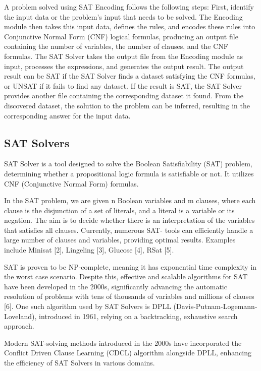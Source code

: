 A problem solved using SAT Encoding follows the following steps: First, identify the
input data or the problem's input that needs to be solved. The Encoding module then
takes this input data, defines the rules, and encodes these rules into Conjunctive Normal
Form (CNF) logical formulas, producing an output file containing the number of
variables, the number of clauses, and the CNF formulas. The SAT Solver takes the
output file from the Encoding module as input, processes the expressions, and generates
the output result. The output result can be SAT if the SAT Solver finds a dataset
satisfying the CNF formulas, or UNSAT if it fails to find any dataset. If the result is
SAT, the SAT Solver provides another file containing the corresponding dataset it
found. From the discovered dataset, the solution to the problem can be inferred, resulting
in the corresponding answer for the input data.

\subsection{SAT Solvers}
SAT Solver is a tool designed to solve the Boolean Satisfiability (SAT) problem,
determining whether a propositional logic formula is satisfiable or not. It utilizes CNF
(Conjunctive Normal Form) formulas.

In the SAT problem, we are given n Boolean variables and m clauses, where each clause
is the disjunction of a set of literals, and a literal is a variable or its negation. The aim is
to decide whether there is an interpretation of the variables that satisfies all clauses.
Currently, numerous SAT- tools can efficiently handle a large number of clauses and
variables, providing optimal results. Examples include Minisat [2], Lingeling [3],
Glucose [4], RSat [5].

SAT is proven to be NP-complete, meaning it has exponential time complexity in the
worst case scenario. Despite this, effective and scalable algorithms for SAT have been
developed in the 2000s, significantly advancing the automatic resolution of problems
with tens of thousands of variables and millions of clauses [6]. One such algorithm used
by SAT Solvers is DPLL (Davis-Putnam-Logemann-Loveland), introduced in 1961,
relying on a backtracking, exhaustive search approach.

Modern SAT-solving methods introduced in the 2000s have incorporated the Conflict
Driven Clause Learning (CDCL) algorithm alongside DPLL, enhancing the efficiency
of SAT Solvers in various domains.

